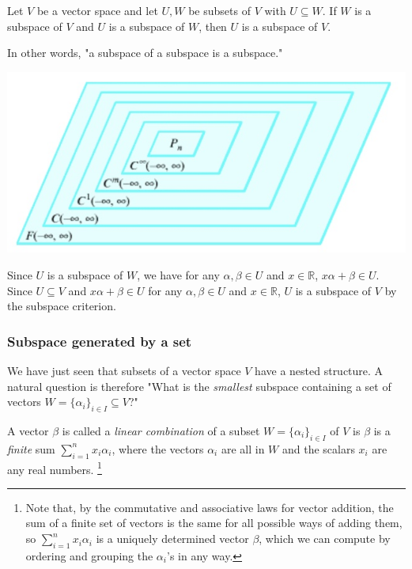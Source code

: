 \documentclass[12pt,letterpaper,reqno]{article}
\numberwithin{equation}{section}
\newcommand{\ti}[1]{\textit{#1}}
\begin{document}
\begin{thm}
	Let $V$ be a vector space and let $U,W$ be subsets of $V$ with $U \subseteq W$. If $W$ is a subspace of $V$ and $U$ is a subspace of $W$, then $U$ is a subspace of $V$.
	
	In other words, "a subspace of a subspace is a subspace."
\end{thm}
\begin{center}
	\includegraphics[scale=0.5]{figures_mvc/nested}
\end{center}

\begin{pf}
	Since $U$ is a subspace of $W$, we have for any $\alpha, \beta \in U$ and $x \in \mathbb{R}$, $x\alpha+\beta \in U$. Since $U \subseteq V$ and $x\alpha+\beta \in U$ for any $\alpha, \beta \in U$ and $x \in \mathbb{R}$, $U$ is a subspace of $V$ by the subspace criterion.
\end{pf}

\subsubsection{Subspace generated by a set}
We have just seen that subsets of a vector space $V$ have a nested structure. A natural question is therefore "What is the \emph{smallest} subspace containing a set of vectors $W=\{\alpha_i\}_{i \in I} \subseteq V$?"

\begin{defn}
	A vector $\beta$ is called a \ti{linear combination} of a subset $W=\{\alpha_i\}_{i \in I}$ of $V$ is $\beta$ is a \ti{finite} sum $\sum_{i=1}^n x_i\alpha_i$, where the vectors $\alpha_i$ are all in $W$ and the scalars $x_i$ are any real numbers. \footnote{Note that, by the commutative and associative laws for vector addition, the sum of a finite set of vectors is the same for all possible ways of adding them, so $\sum_{i=1}^n x_i\alpha_i$ is a uniquely determined vector $\beta$, which we can compute by ordering and grouping the $\alpha_i$'s in any way.}
\end{defn}
\end{document}
